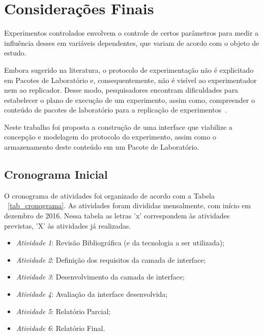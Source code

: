 \chapter{Considerações Finais}
\label{cp:conclusoes}

Experimentos controlados envolvem o controle de certos parâmetros para medir a influência desses em variáveis dependentes, que variam de acordo com o objeto de estudo. 

Embora sugerido na literatura, o protocolo de experimentação não é explicitado em Pacotes de Laboratório e, consequentemente, não é visível ao experimentador nem ao replicador. Desse modo, pesquisadores encontram dificuldades para estabelecer o plano de execução de um experimento, assim como, compreender o conteúdo de pacotes de laboratório para a replicação de experimentos~\cite{Wohlin2012}.

Neste trabalho foi proposta a construção de uma interface que viabilize a concepção e modelagem do protocolo do experimento, assim como o armazenamento deste conteúdo em um Pacote de Laboratório.

\section{Cronograma Inicial}
O cronograma de atividades foi organizado de acordo com a Tabela ~\ref{tab_cronograma}. As atividades foram divididas mensalmente, com início em dezembro de 2016. Nessa tabela as letras 'x' correspondem às atividades previstas, 'X' às atividades já realizadas.

\begin{itemize}
\item \textit{Atividade 1}: Revisão Bibliográfica (e da tecnologia a ser utilizada);
\item \textit{Atividade 2}: Definição dos requisitos da camada de interface;
\item \textit{Atividade 3}: Desenvolvimento da camada de interface;
\item \textit{Atividade 4}: Avaliação da interface desenvolvida;
\item \textit{Atividade 5}: Relatório Parcial;
\item \textit{Atividade 6}: Relatório Final.

\end{itemize}


